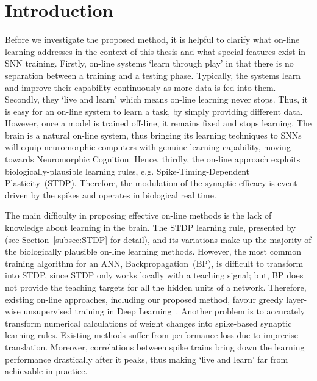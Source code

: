 \section{Introduction}
\label{sec:SRM_intro}
Before we investigate the proposed method, it is helpful to clarify what on-line learning addresses in the context of this thesis and what special features exist in SNN training.
Firstly, on-line systems `learn through play' in that there is no separation between a training and a testing phase.
Typically, the systems learn and improve their capability continuously as more data is fed into them.
Secondly, they `live and learn' which means on-line learning never stops.
Thus, it is easy for an on-line system to learn a task, by simply providing different data.
However, once a model is trained off-line, it remains fixed and stops learning.
The brain is a natural on-line system, thus bringing its learning techniques to SNNs will equip neuromorphic computers with genuine learning capability, moving towards Neuromorphic Cognition.
Hence, thirdly, the on-line approach exploits biologically-plausible learning rules, e.g. Spike-Timing-Dependent Plasticity~(STDP).
Therefore, the modulation of the synaptic efficacy is event-driven by the spikes and operates in biological real time.


The main difficulty in proposing effective on-line methods is the lack of knowledge about learning in the brain.
The STDP learning rule, presented by~\citet{bi1998synaptic} (see Section~\ref{subsec:STDP} for detail), and its variations make up the majority of the biologically plausible on-line learning methods.
However, the most common training algorithm for an ANN, Backpropagation~(BP), is difficult to transform into STDP, since STDP only works locally with a teaching signal; but, BP does not provide the teaching targets for all the hidden units of a network.
Therefore, existing on-line approaches, including our proposed method, favour greedy layer-wise unsupervised training in Deep Learning~\citep{hinton2006fast}.
Another problem is to accurately transform numerical calculations of weight changes into spike-based synaptic learning rules.
Existing methods suffer from performance loss due to imprecise translation.
Moreover, correlations between spike trains bring down the learning performance drastically after it peaks, thus making `live and learn' far from achievable in practice.

